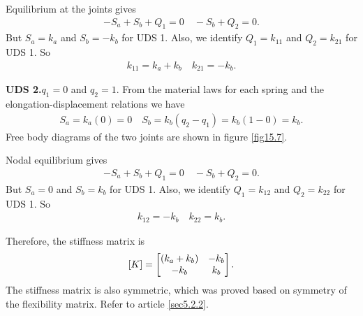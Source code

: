 \documentclass{AeroStructure-ERJohnson}
\begin{document}
\begin{example}
{\def\thefigure{15.7}
}

\noindent Equilibrium at the joints gives
\begin{align}\label{ex15.1m}
-S_{a}+S_{b}+Q_{1}=0 \quad{-}S_{b}+Q_{2}=0.
\end{align}
But $S_{a}=k_{a}$ and $S_{b}=-k_{b}$ for UDS 1. Also, we identify $Q_{1}=k_{11}$ and $Q_{2}=k_{21}$ for UDS 1. So
\begin{align}\label{ex15.1n}
k_{11}=k_{a}+k_{b} \quad k_{21}=-k_{b}.
\end{align}

\noindent\textbf{UDS 2.}\enskip $q_{1}=0$ and $q_{2}=1$. From the material laws for each spring and the elongation-displacement relations we have
\begin{align}\label{ex15.1o}
S_{a}=k_{a}(0)=0 \quad S_{b}=k_{b}(q_{2}-q_{1})=k_{b}(1-0)=k_{b}.
\end{align}
Free body diagrams of the two joints are shown in figure \ref{fig15.7}.

{\def\thefigure{15.8}
}

Nodal equilibrium gives
\begin{align}\label{ex15.1p}
-S_{a}+S_{b}+Q_{1}=0 \quad{-}S_{b}+Q_{2}=0.
\end{align}
But $S_{a}=0$ and $S_{b}=k_{b}$ for UDS 1. Also, we identify $Q_{1}=k_{12}$ and $Q_{2}=k_{22}$ for UDS 1. So
\begin{align}\label{ex15.1q}
k_{12}=-k_{b} \quad k_{22}=k_{b}.
\end{align}

Therefore, the stiffness matrix is
\begin{align}\label{ex15.1r}
[K]=\left[\begin{array}{@{}cc@{}}(k_{a}+k_{b}) & -k_{b} \\-k_{b} & k_{b}\end{array}\right].
\end{align}
The stiffness matrix is also symmetric, which was proved based on symmetry of the flexibility matrix. Refer to article \ref{sec5.2.2}.


\end{example}
\end{document}
